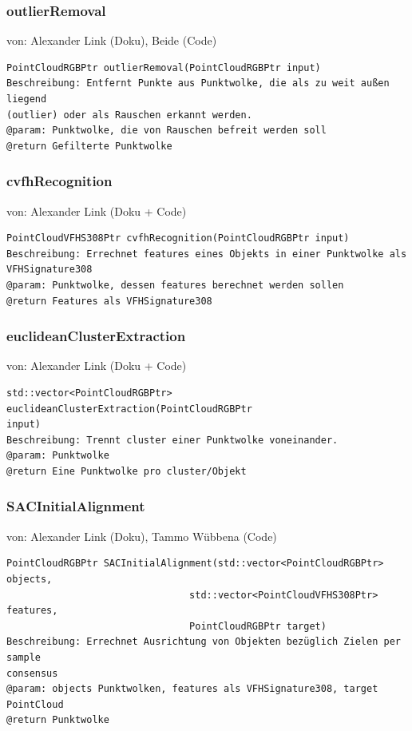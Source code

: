 \documentclass{suturo}
\makeatletter
\newcommand{\chapterauthor}[1]{%
  {\parindent0pt\vspace*{-27pt}%
  \linespread{0}\small\begin{flushright}von: #1\end{flushright}%
  \par\nobreak\vspace*{0pt}}
  \@afterheading%
}
\makeatother
\begin{document}
\subsubsection{outlierRemoval}
\chapterauthor{Alexander Link (Doku), Beide (Code)}
\begin{verbatim}
PointCloudRGBPtr outlierRemoval(PointCloudRGBPtr input)
Beschreibung: Entfernt Punkte aus Punktwolke, die als zu weit außen liegend
(outlier) oder als Rauschen erkannt werden.
@param: Punktwolke, die von Rauschen befreit werden soll
@return Gefilterte Punktwolke
\end{verbatim}\label{func:outlierremoval}

\subsubsection{cvfhRecognition}
\chapterauthor{Alexander Link (Doku + Code)}
\begin{verbatim}
PointCloudVFHS308Ptr cvfhRecognition(PointCloudRGBPtr input)
Beschreibung: Errechnet features eines Objekts in einer Punktwolke als
VFHSignature308
@param: Punktwolke, dessen features berechnet werden sollen
@return Features als VFHSignature308
\end{verbatim}\label{func:cvfhRecognition}

\subsubsection{euclideanClusterExtraction}
\chapterauthor{Alexander Link (Doku + Code)}
\begin{verbatim}
std::vector<PointCloudRGBPtr> euclideanClusterExtraction(PointCloudRGBPtr
input)
Beschreibung: Trennt cluster einer Punktwolke voneinander.
@param: Punktwolke
@return Eine Punktwolke pro cluster/Objekt
\end{verbatim}\label{func:euclideanClusterExtraction}

\subsubsection{SACInitialAlignment}
\chapterauthor{Alexander Link (Doku), Tammo Wübbena (Code)}
\begin{verbatim}
PointCloudRGBPtr SACInitialAlignment(std::vector<PointCloudRGBPtr> objects,
                                std::vector<PointCloudVFHS308Ptr> features,
                                PointCloudRGBPtr target)
Beschreibung: Errechnet Ausrichtung von Objekten bezüglich Zielen per sample
consensus
@param: objects Punktwolken, features als VFHSignature308, target PointCloud
@return Punktwolke
\end{verbatim}\label{func:sacinitialalignment}
\end{document}
